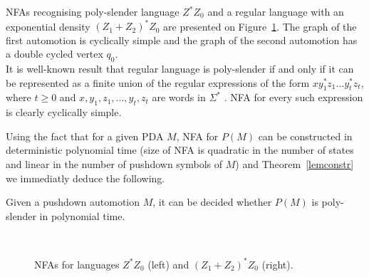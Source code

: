 \begin{example}
NFAs recognising poly-slender language $Z^*Z_0$ and a regular language with an exponential density ${(Z_1+Z_2)}^*Z_0$ are presented on Figure~\ref{graphufn}. The graph of the first automotion is cyclically simple and the graph of the second automotion has a double cycled vertex $q_0$. 
\\It is well-known result that regular language is poly-slender if and only if it can be represented as a finite union of the regular expressions of the form $xy^*_1z_1... y^*_tz_t$, where $t \ge 0$ and $x, y_1, z_1, ... , y_t, z_t$ are words in $\Sigma^*$ \cite{poldens}. NFA for every such expression is clearly cyclically simple. 
\end{example}
Using the fact that for a given PDA $M$, NFA for $P(M)$ can be constructed in deterministic polynomial time (size of NFA is quadratic in the number of states and linear in the number of pushdown symbols of $M$) \cite*{Geffert, Malcher} and Theorem~\ref{lemconstr} we immediatly deduce the following.
\begin{corollary}
Given a pushdown automotion $M$, it can be decided whether $P(M)$ is poly-slender in polynomial time.
\end{corollary}

\begin{figure}
\\
	\caption{NFAs for languages $Z^*Z_0$ (left) and ${(Z_1+Z_2)}^*Z_0$ (right).}
\label{graphufn}
\end{figure}

